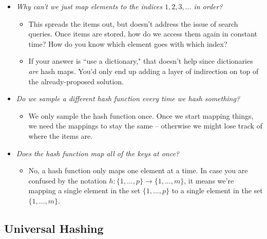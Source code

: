 \documentclass[11pt]{article}
\begin{document}
\begin{itemize}
\item \textit{Why can't we just map elements to the indices $1, 2, 3, ...$ in order?}
  \begin{itemize}
  \item This spreads the items out, but doesn't address the issue of search queries. Once items are stored, how do we access them again in constant time? How do you know which element goes with which index?
  \item If your answer is ``use a dictionary," that doesn't help since dictionaries \textit{are} hash maps. You'd only end up adding a layer of indirection on top of the already-proposed solution.
  \end{itemize}

\item \textit{Do we sample a different hash function every time we hash something?}
  \begin{itemize}
  \item We only sample the hash function once. Once we start mapping things, we need the mappings to stay the same -- otherwise we might lose track of where the items are.
  \end{itemize}

\item \textit{Does the hash function map all of the keys at once?}
  \begin{itemize}
  \item No, a hash function only maps one element at a time. In case you are confused by the notation $h: \{1, ..., p\} \to \{1, ..., m\}$, it means we're mapping a single element in the set $\{1, ..., p\}$ to a single element in the set $\{1, ..., m\}$.
  \end{itemize}
\end{itemize}

\subsection*{Universal Hashing}
\end{document}
